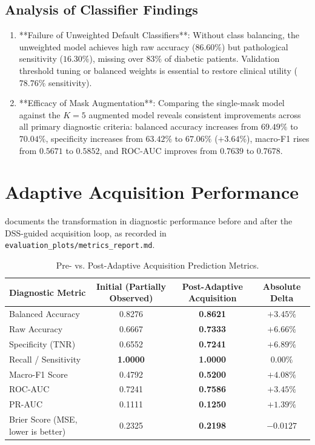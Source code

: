 \documentclass[11pt,a4paper]{report}
\begin{document}
\subsection{Analysis of Classifier Findings}
\begin{enumerate}[leftmargin=*]
  \item **Failure of Unweighted Default Classifiers**: Without class balancing, the unweighted model achieves high raw accuracy ($86.60\%$) but pathological sensitivity ($16.30\%$), missing over $83\%$ of diabetic patients. Validation threshold tuning or balanced weights is essential to restore clinical utility ($78.76\%$ sensitivity).
  \item **Efficacy of Mask Augmentation**: Comparing the single-mask model against the $K=5$ augmented model reveals consistent improvements across all primary diagnostic criteria: balanced accuracy increases from $69.49\%$ to $70.04\%$, specificity increases from $63.42\%$ to $67.06\%$ ($+3.64\%$), macro-F1 rises from $0.5671$ to $0.5852$, and ROC-AUC improves from $0.7639$ to $0.7678$.
\end{enumerate}

\section{Adaptive Acquisition Performance}
 documents the transformation in diagnostic performance before and after the DSS-guided acquisition loop, as recorded in \texttt{evaluation\_plots/metrics\_report.md}.

\begin{table}[htbp]
  \centering
  \small
  \caption{Pre- vs. Post-Adaptive Acquisition Prediction Metrics.}
  \label{tab:adaptive_prediction}
  \begin{tabularx}{0.85\textwidth}{lccc}
    \toprule
    \textbf{Diagnostic Metric} & \textbf{Initial (Partially Observed)} & \textbf{Post-Adaptive Acquisition} & \textbf{Absolute Delta} \\
    \midrule
    Balanced Accuracy & 0.8276 & \textbf{0.8621} & $+3.45\%$ \\
    Raw Accuracy & 0.6667 & \textbf{0.7333} & $+6.66\%$ \\
    Specificity (TNR) & 0.6552 & \textbf{0.7241} & $+6.89\%$ \\
    Recall / Sensitivity & \textbf{1.0000} & \textbf{1.0000} & $0.00\%$ \\
    Macro-F1 Score & 0.4792 & \textbf{0.5200} & $+4.08\%$ \\
    ROC-AUC & 0.7241 & \textbf{0.7586} & $+3.45\%$ \\
    PR-AUC & 0.1111 & \textbf{0.1250} & $+1.39\%$ \\
    Brier Score (MSE, lower is better) & 0.2325 & \textbf{0.2198} & $-0.0127$ \\
    \bottomrule
  \end{tabularx}
\end{table}
\end{document}
